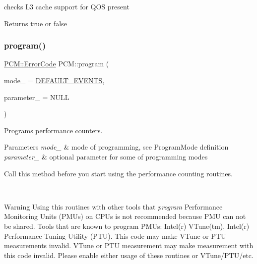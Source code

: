 checks L3 cache support for Q\+OS present 

\begin{DoxyReturn}{Returns}
true or false 
\end{DoxyReturn}
\mbox{\label{class_p_c_m_abae9577a1a172c944d133bef10683825}} 
\subsubsection{\texorpdfstring{program()}{program()}}
{\footnotesize\ttfamily \mbox{\hyperlink{class_p_c_m_abebf5f22d794719dfc49155741e264e5}{P\+C\+M\+::\+Error\+Code}} P\+C\+M\+::program (\begin{DoxyParamCaption}\item[{const \mbox{\hyperlink{class_p_c_m_a88584813a3ef51376efeb22928764786}{Program\+Mode}}}]{mode\+\_\+ = {\ttfamily \mbox{\hyperlink{class_p_c_m_a88584813a3ef51376efeb22928764786a0e861144f482697cfa423b012ed42451}{D\+E\+F\+A\+U\+L\+T\+\_\+\+E\+V\+E\+N\+TS}}},  }\item[{const void $\ast$}]{parameter\+\_\+ = {\ttfamily NULL} }\end{DoxyParamCaption})}



Programs performance counters. 


\begin{DoxyParams}{Parameters}
{\em mode\+\_\+} & mode of programming, see Program\+Mode definition \\
\hline
{\em parameter\+\_\+} & optional parameter for some of programming modes \begin{DoxyVerb}    Call this method before you start using the performance counting routines.
\end{DoxyVerb}
\\
\hline
\end{DoxyParams}
\begin{DoxyWarning}{Warning}
Using this routines with other tools that {\itshape program} Performance Monitoring Units (P\+M\+Us) on C\+P\+Us is not recommended because P\+MU can not be shared. Tools that are known to program P\+M\+Us\+: Intel(r) V\+Tune(tm), Intel(r) Performance Tuning Utility (P\+TU). This code may make V\+Tune or P\+TU measurements invalid. V\+Tune or P\+TU measurement may make measurement with this code invalid. Please enable either usage of these routines or V\+Tune/\+P\+T\+U/etc. 
\end{DoxyWarning}
\mbox{\label{class_p_c_m_ac75fcae283d8c6f0ef7085a913685f0b}} 
